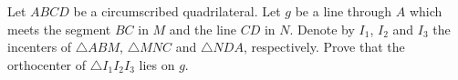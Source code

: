 Let $ABCD$ be a circumscribed quadrilateral. Let $g$ be a line through $A$ which meets the segment $BC$ in $M$ and the line $CD$ in $N$. Denote by $I_1$,  $I_2$ and $I_3$ the incenters of $\triangle ABM$,  $\triangle MNC$ and $\triangle NDA$,  respectively. Prove that the orthocenter of $\triangle I_1I_2I_3$ lies on $g$.